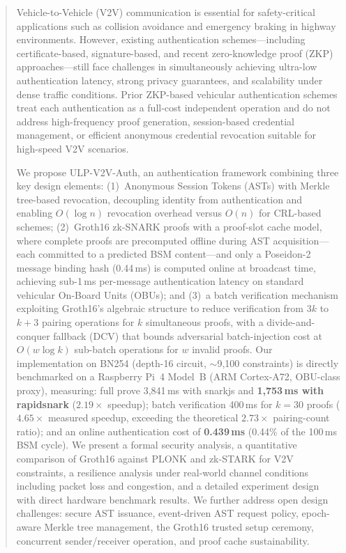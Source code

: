 \begin{abstract}
Vehicle-to-Vehicle (V2V) communication is essential for safety-critical applications
such as collision avoidance and emergency braking in highway environments. However,
existing authentication schemes---including certificate-based, signature-based, and
recent zero-knowledge proof (ZKP) approaches---still face challenges in simultaneously
achieving ultra-low authentication latency, strong privacy guarantees, and scalability
under dense traffic conditions. Prior ZKP-based vehicular authentication schemes treat
each authentication as a full-cost independent operation and do not address
high-frequency proof generation, session-based credential management, or efficient
anonymous credential revocation suitable for high-speed V2V scenarios.

We propose ULP-V2V-Auth, an authentication framework combining three key design
elements: (1)~Anonymous Session Tokens (ASTs) with Merkle tree-based revocation,
decoupling identity from authentication and enabling $O(\log n)$ revocation overhead
versus $O(n)$ for CRL-based schemes; (2)~Groth16 zk-SNARK proofs with a
proof-slot cache model, where complete proofs are precomputed offline during AST
acquisition---each committed to a predicted BSM content---and only a Poseidon-2
message binding hash (0.44\,ms) is computed online at broadcast time, achieving
sub-1\,ms per-message authentication latency on standard vehicular On-Board Units
(OBUs); and (3)~a batch verification mechanism exploiting Groth16's algebraic
structure to reduce verification from $3k$ to $k+3$ pairing operations for $k$
simultaneous proofs, with a divide-and-conquer fallback (DCV) that bounds adversarial
batch-injection cost at $O(w \log k)$ sub-batch operations for $w$ invalid proofs.
Our implementation on BN254 (depth-16 circuit, $\sim$9{,}100 constraints) is directly
benchmarked on a Raspberry Pi~4 Model~B (ARM Cortex-A72, OBU-class proxy),
measuring: full prove 3{,}841\,ms with snarkjs and \textbf{1{,}753\,ms with rapidsnark}
($2.19\times$ speedup); batch verification 400\,ms for $k=30$ proofs
($\mathbf{4.65\times}$ measured speedup, exceeding the theoretical $2.73\times$
pairing-count ratio); and an online authentication cost of \textbf{0.439\,ms}
(0.44\% of the 100\,ms BSM cycle). We present a formal security analysis, a
quantitative comparison of Groth16 against PLONK and zk-STARK for V2V constraints,
a resilience analysis under real-world channel conditions including packet loss and
congestion, and a detailed experiment design with direct hardware benchmark results.
We further address open design challenges: secure AST issuance, event-driven AST
request policy, epoch-aware Merkle tree management, the Groth16 trusted setup
ceremony, concurrent sender/receiver operation, and proof cache sustainability.
\end{abstract}
